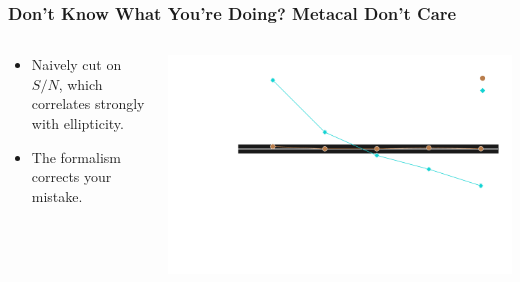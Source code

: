 \documentclass{beamer}
\newcommand{\snr}{$S/N$}
\begin{document}
\frame
{
    \frametitle{Don't Know What You're Doing?  Metacal Don't Care}
 
 
    \begin{columns}
        \begin{column}{0.4\textwidth}
            \begin{itemize}
                \item Naively cut on {\color{lightsteelblue} \snr}, which correlates
                    strongly with ellipticity.
                \item The formalism corrects your mistake.
            \end{itemize}
        \end{column}
        \begin{column}{0.6\textwidth}
            \begin{center}
            \includegraphics[width=\textwidth]{mc-select-bias-thresh-with-nocorr-inv.pdf}
                \newline
            \end{center}
        \end{column}
    \end{columns}


}
\end{document}

